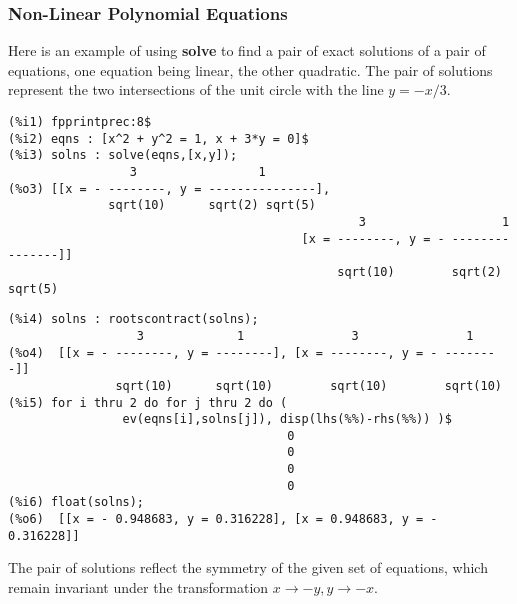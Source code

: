 \documentclass[12pt]{article}
\begin{document}
\subsubsection{Non-Linear Polynomial Equations}
Here is an example of using \textbf{solve} to find a pair of exact solutions
  of a pair of equations, one equation being linear, the other quadratic.
The pair of solutions represent the two intersections of the unit circle
  with the line $y = -x/3.$
\small
\begin{verbatim}
(%i1) fpprintprec:8$
(%i2) eqns : [x^2 + y^2 = 1, x + 3*y = 0]$
(%i3) solns : solve(eqns,[x,y]);
                 3                 1
(%o3) [[x = - --------, y = ---------------],
              sqrt(10)      sqrt(2) sqrt(5)
                                                 3                   1
                                         [x = --------, y = - ---------------]]
                                              sqrt(10)        sqrt(2) sqrt(5)
\end{verbatim}
\newpage
\begin{verbatim}
(%i4) solns : rootscontract(solns);
                  3             1               3               1
(%o4)  [[x = - --------, y = --------], [x = --------, y = - --------]]
               sqrt(10)      sqrt(10)        sqrt(10)        sqrt(10)
(%i5) for i thru 2 do for j thru 2 do (
                ev(eqns[i],solns[j]), disp(lhs(%%)-rhs(%%)) )$
                                       0
                                       0
                                       0
                                       0
(%i6) float(solns);
(%o6)  [[x = - 0.948683, y = 0.316228], [x = 0.948683, y = - 0.316228]]
\end{verbatim}
\normalsize
The pair of solutions reflect the symmetry of the given set of equations, which
  remain invariant under the transformation $x \rightarrow - y, y \rightarrow - x$.
\end{document}
